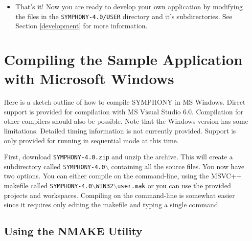 \begin{itemize}
        \item That's it! Now you are ready to develop your own application by
        modifying the files in the \texttt{SYMPHONY-4.0/USER} directory and
        it's subdirectories. See Section \ref{development} for more
        information.

\end{itemize}


\section{Compiling the Sample Application with Microsoft Windows}
\label{getting_started_windows}

Here is a sketch outline of how to compile SYMPHONY in MS Windows. Direct
support is provided for compilation with MS Visual Studio 6.0. Compilation for
other compilers should also be possible. Note that the Windows version has
some limitations. Detailed timing information is not currently provided.
Support is only provided for running in sequential mode at this time.

First, download \texttt{SYMPHONY-4.0.zip} and unzip the archive. This will
create a subdirectory called \texttt{SYMPHONY-4.0$\backslash$} containing all
the source files. You now have two options. You can either compile on the
command-line, using the MSVC++ makefile called
\texttt{SYMPHONY-4.0$\backslash$WIN32$\backslash$user.mak} or you
can use the provided projects and workspaces. Compiling on the command-line is
somewhat easier since it requires only editing the makefile and typing a
single command.

\subsection{Using the NMAKE Utility}

